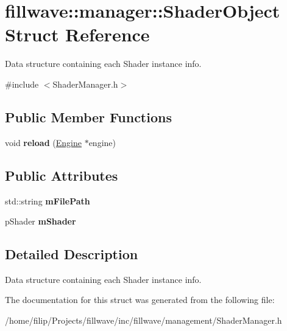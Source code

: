 \hypertarget{structfillwave_1_1manager_1_1ShaderObject}{}\section{fillwave\+:\+:manager\+:\+:Shader\+Object Struct Reference}
\label{structfillwave_1_1manager_1_1ShaderObject}


Data structure containing each Shader instance info.  




{\ttfamily \#include $<$Shader\+Manager.\+h$>$}

\subsection*{Public Member Functions}
\begin{DoxyCompactItemize}
\item 
\hypertarget{structfillwave_1_1manager_1_1ShaderObject_a3961047887eddada973ab38323507918}{}void {\bfseries reload} (\hyperlink{classfillwave_1_1Engine}{Engine} $\ast$engine)\label{structfillwave_1_1manager_1_1ShaderObject_a3961047887eddada973ab38323507918}

\end{DoxyCompactItemize}
\subsection*{Public Attributes}
\begin{DoxyCompactItemize}
\item 
\hypertarget{structfillwave_1_1manager_1_1ShaderObject_ad68e7fa487b41bcc87dd74507eb5b307}{}std\+::string {\bfseries m\+File\+Path}\label{structfillwave_1_1manager_1_1ShaderObject_ad68e7fa487b41bcc87dd74507eb5b307}

\item 
\hypertarget{structfillwave_1_1manager_1_1ShaderObject_adc28ea8317981481f13ecab395568e7a}{}p\+Shader {\bfseries m\+Shader}\label{structfillwave_1_1manager_1_1ShaderObject_adc28ea8317981481f13ecab395568e7a}

\end{DoxyCompactItemize}


\subsection{Detailed Description}
Data structure containing each Shader instance info. 

The documentation for this struct was generated from the following file\+:\begin{DoxyCompactItemize}
\item 
/home/filip/\+Projects/fillwave/inc/fillwave/management/Shader\+Manager.\+h\end{DoxyCompactItemize}
